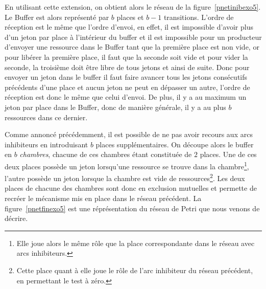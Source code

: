 En utilisant cette extension, on obtient alors le réseau de la figure~\ref{pnetinibexo5}. Le Buffer
est alors représenté par $b$ places et $b-1$ transitions. L'ordre de réception est le même que
l'ordre d'envoi, en effet, il est impossible d'avoir plus d'un jeton par place à l'intérieur du
buffer et il est impossible pour un producteur d'envoyer une ressource dans le Buffer tant que la
première place est non vide, or pour libérer la première place, il faut que la seconde soit vide et
pour vider la seconde, la troisième doit être libre de tous jetons et ainsi de suite. Donc pour
envoyer un jeton dans le buffer il faut faire avancer tous les jetons consécutifs précédents d'une
place et aucun jeton ne peut en dépasser un autre, l'ordre de réception est donc le même que celui
d'envoi. De plus, il y a au maximum un jeton par place dans le Buffer, donc de manière générale, il
y a au plus $b$ ressources dans ce dernier.

Comme annoncé précédemment, il est possible de ne pas avoir recours aux arcs inhibiteurs en
introduisant $b$ places supplémentaires. On découpe alors le buffer en $b$ \emph{chambres}, chacune
de ces chambres étant constituée de $2$ places. Une de ces deux places possède un jeton lorsqu'une
ressource se trouve dans la chambre\footnote{Elle joue alors le même rôle que la place
correspondante dans le réseau avec arcs inhibiteurs.}, l'autre possède un jeton lorsque la chambre
est vide de ressources\footnote{Cette place quant à elle joue le rôle de l'arc inhibiteur du réseau
précédent, en permettant le test à zéro.}. Les deux places de chacune des chambres sont donc en
exclusion mutuelles et permette de recréer le mécanisme mis en place dans le réseau précédent. La
figure~\ref{pnetfinexo5} est une réprésentation du réseau de Petri que nous venons de décrire.
